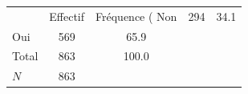 {
\def\sym#1{\ifmmode^{#1}\else\(^{#1}\)\fi}
\begin{tabular}{l*{1}{cc}}
\toprule
            &    Effectif&Fréquence (%
\midrule
Non         &         294&        34.1\\
Oui         &         569&        65.9\\
Total       &         863&       100.0\\
\midrule
\(N\)       &         863&            \\
\bottomrule
\end{tabular}
}
